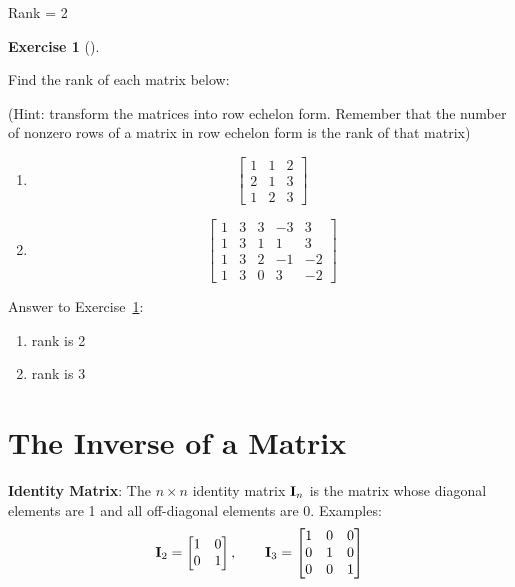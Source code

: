 \documentclass[
  letterpaper,
]{book}
\providecommand{\tightlist}{%
  \setlength{\itemsep}{0pt}\setlength{\parskip}{0pt}}\usepackage{longtable,booktabs,array}
\theoremstyle{definition}
\theoremstyle{definition}
\theoremstyle{plain}
\theoremstyle{definition}
\newtheorem{exercise}{Exercise}[chapter]
\theoremstyle{plain}
\theoremstyle{plain}
\theoremstyle{remark}
\begin{document}
Rank = 2

\leavevmode{}%
\begin{exercise}[]\label{exr-rank}

Find the rank of each matrix below:

(Hint: transform the matrices into row echelon form. Remember that the
number of nonzero rows of a matrix in row echelon form is the rank of
that matrix)

\begin{enumerate}
\def\labelenumi{\arabic{enumi}.}
\item
  \[\begin{bmatrix} 1 & 1 & 2 \\ 
    2 & 1 & 3 \\
    1 & 2 & 3 \end{bmatrix}\]
\item
  \[\begin{bmatrix} 1 & 3 & 3 & -3 & 3\\ 
  1 & 3 & 1 & 1 & 3 \\
  1 & 3 & 2 & -1 & -2 \\
  1 & 3 & 0 & 3 & -2 \end{bmatrix}\]
\end{enumerate}

\end{exercise}

Answer to Exercise~\ref{exr-rank}:

\begin{enumerate}
\def\labelenumi{\arabic{enumi}.}
\tightlist
\item
  rank is 2
\item
  rank is 3
\end{enumerate}

\hypertarget{the-inverse-of-a-matrix}{%
\section{The Inverse of a Matrix}\label{the-inverse-of-a-matrix}}

\textbf{Identity Matrix}: The \(n\times n\) identity matrix
\({\bf I}_n\) is the matrix whose diagonal elements are 1 and all
off-diagonal elements are 0. Examples:
\[ {\bf I}_2=\begin{bmatrix} 1&0\\0&1 \end{bmatrix}, \qquad {\bf I}_3=\begin{bmatrix} 1&0&0\\ 0&1&0\\ 
            0&0&1 \end{bmatrix}\]
\end{document}
